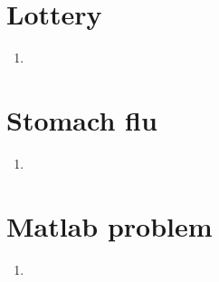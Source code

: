 \documentclass{article}
\begin{document}
\section{Lottery}%
\label{sec:Lottery}
\begin{enumerate}[label=\alph*.]
    \item 
\end{enumerate}

\section{Stomach flu}%
\label{sec:Stomach flu}
\begin{enumerate}[label=\alph*.]
    \item 
\end{enumerate}

\section{Matlab problem}%
\label{sec:Matlab problem}
\begin{enumerate}[label=\alph*.]
    \item 
\end{enumerate}

\end{document}

